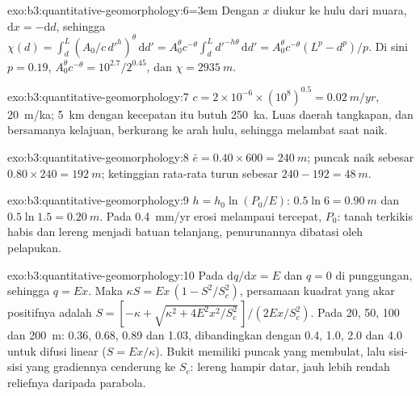 \begin{solution}{exo:b3:quantitative-geomorphology:6}\begingroup\emergencystretch=3em\relax 
Dengan $x$ diukur ke hulu dari muara, $\mathrm{d}x = -\mathrm{d}d$, sehingga $\chi(d)
= \int_d^L (A_0/c\,d'^{h})^{\theta}\,\mathrm{d}d' = A_0^{\theta} c^{-\theta}
\int_d^L d'^{-h\theta}\,\mathrm{d}d' = A_0^{\theta}c^{-\theta}(L^p -
d^p)/p$. Di sini $p = 0.19$, $A_0^{\theta}c^{-\theta} = 10^{2.7}/2^{0.45}$,
dan $\chi = \qty{2935}{m}$.
\par\endgroup\end{solution}

\begin{solution}{exo:b3:quantitative-geomorphology:7}
$c = 2\times10^{-6}\times(10^8)^{0.5} = \qty{0.02}{m/yr}$, \qty{20}{m/ka};
\qty{5}{km} dengan kecepatan itu butuh \qty{250}{ka}. Luas daerah tangkapan, dan bersamanya
kelajuan, berkurang ke arah hulu, sehingga  melambat saat naik.
\end{solution}

\begin{solution}{exo:b3:quantitative-geomorphology:8}
$\bar e = 0.40\times600 = \qty{240}{m}$; puncak naik sebesar $0.80\times240 =
\qty{192}{m}$; ketinggian rata-rata turun sebesar $240 - 192 = \qty{48}{m}$.
\end{solution}

\begin{solution}{exo:b3:quantitative-geomorphology:9}
$h = h_0\ln(P_0/E)$: $0.5\ln 6 = \qty{0.90}{m}$ dan $0.5\ln1.5 =
\qty{0.20}{m}$. Pada \qty{0.4}{mm/yr} erosi melampaui  tercepat,
$P_0$: tanah terkikis habis dan lereng menjadi batuan telanjang, penurunannya
dibatasi oleh pelapukan.
\end{solution}

\begin{solution}{exo:b3:quantitative-geomorphology:10}
Pada  $\mathrm{d}q/\mathrm{d}x = E$ dan $q = 0$ di punggungan, sehingga
$q = E x$. Maka $\kappa S = E x\,(1 - S^2/S_c^2)$, persamaan kuadrat yang akar positifnya
adalah $S = [-\kappa + \sqrt{\kappa^2 + 4E^2x^2/S_c^2}\,]/(2Ex/S_c^2)$. Pada
20, 50, 100 dan \qty{200}{m}: 0.36, 0.68, 0.89 dan 1.03, dibandingkan dengan 0.4, 1.0,
2.0 dan 4.0 untuk difusi linear ($S = Ex/\kappa$). Bukit memiliki puncak yang
membulat, lalu sisi-sisi yang gradiennya cenderung ke $S_c$: lereng hampir datar, jauh
lebih rendah reliefnya daripada parabola.
\end{solution}


